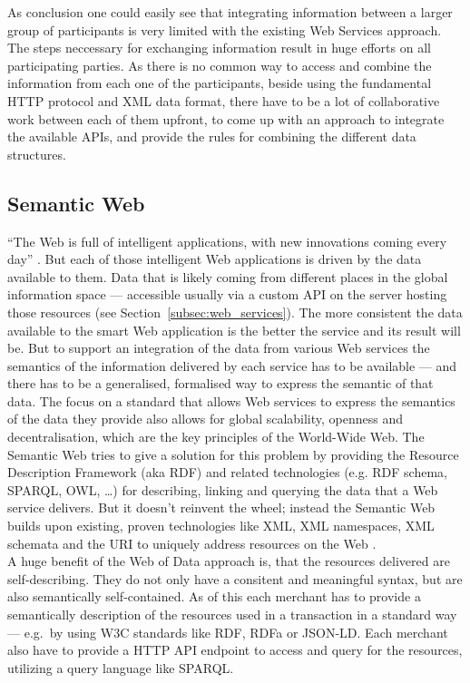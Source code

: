 As conclusion one could easily see that integrating information between a larger group of participants is very limited with the existing Web Services approach. The steps neccessary for exchanging information result in huge efforts on all participating parties. As there is no common way to access and combine the information from each one of the participants, beside using the fundamental \gls{HTTP} protocol and \gls{XML} data format, there have to be a lot of collaborative work between each of them upfront, to come up with an approach to integrate the available \gls{API}s, and provide the rules for combining the different data structures.


\subsection{Semantic Web}
\label{subsec:web_data}

``The Web is full of intelligent applications, with new innovations coming every day'' \citep{allemang2011semantic}. But each of those intelligent Web applications is driven by the data available to them. Data that is likely coming from different places in the global information space — accessible usually via a custom API on the server hosting those resources (see Section~\ref{subsec:web_services}). The more consistent the data available to the smart Web application is the better the service and its result will be. But to support an integration of the data from various Web services the semantics of the information delivered by each service has to be available — and there has to be a generalised, formalised way to express the semantic of that data. The focus on a standard that allows Web services to express the semantics of the data they provide also allows for global scalability, openness and decentralisation, which are the key principles of the World-Wide Web. The Semantic Web tries to give a solution for this problem by providing the Resource Description Framework (aka \gls{RDF}) and related technologies (e.g. RDF schema, SPARQL, OWL, \ldots) for describing, linking and querying the data that a Web service delivers. But it doesn’t reinvent the wheel; instead the Semantic Web builds upon existing, proven technologies like XML, XML namespaces, XML schemata and the \gls{URI} to uniquely address resources on the Web \citep{allemang2011semantic}. \\

A huge benefit of the Web of Data approach is, that the resources delivered are self-describing. They do not only have a consitent and meaningful syntax, but are also semantically self-contained. As of this each merchant has to provide a semantically description of the resources used in a transaction in a standard way --- e.g.\ by using \gls{W3C} standards like \gls{RDF}, \gls{RDFa} or \gls{JSON-LD}. Each merchant also have to provide a \gls{HTTP} \gls{API} endpoint to access and query for the resources, utilizing a query language like \gls{SPARQL}. \\

